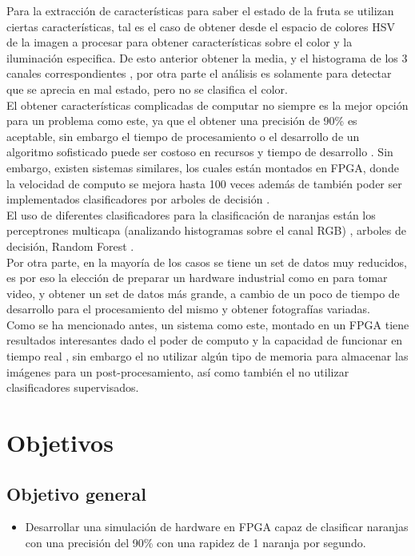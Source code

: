 \documentclass[twoside,spanish,ESP,MSc]{plantillaLabUPV}
\theoremstyle{definition}
\begin{document}
Para la extracción de características para saber el estado de la fruta se utilizan ciertas características, tal es el caso de obtener desde el espacio de colores HSV de la imagen a procesar para obtener características sobre el color y la iluminación especifica. De esto anterior obtener la media, y el histograma de los 3 canales correspondientes \cite{analis,chokun}, por otra parte el análisis es solamente para detectar que se aprecia en mal estado, pero no se clasifica el color.\\

El obtener características complicadas de computar no siempre es la mejor opción para un problema como este, ya que el obtener una precisión de 90\% es aceptable, sin embargo el tiempo de procesamiento o el desarrollo de un algoritmo sofisticado puede ser costoso en recursos y tiempo de desarrollo \cite{curvelet}. Sin embargo, existen sistemas similares, los cuales están montados en FPGA, donde la velocidad de computo se mejora hasta 100 veces \cite{faste} además de también poder ser implementados clasificadores por arboles de decisión \cite{friend}.\\

El uso de diferentes clasificadores para la clasificación de naranjas están los perceptrones multicapa (analizando histogramas sobre el canal RGB) \cite{classi,analis}, arboles de decisión, Random Forest \cite{analis,rfrf}. \\

Por otra parte, en la mayoría de los casos se tiene un set de datos muy reducidos, es por eso la elección de preparar un hardware industrial como en \cite{machineorang,machinefruit} para tomar video, y obtener un set de datos más grande, a cambio de un poco de tiempo de desarrollo para el procesamiento del mismo y obtener fotografías variadas.\\

Como se ha mencionado antes, un sistema como este, montado en un FPGA tiene resultados interesantes dado el poder de computo y la capacidad de funcionar en tiempo real \cite{josu}, sin embargo el no utilizar algún tipo de memoria para almacenar las imágenes para un post-procesamiento, así como también el no utilizar clasificadores supervisados.


\section{Objetivos}
\subsection*{Objetivo general}
\begin{itemize}[noitemsep]
 \item Desarrollar una simulación de hardware en FPGA capaz de clasificar naranjas con una precisión del 90\% con una rapidez de 1 naranja por segundo.
\end{itemize}
\end{document}
